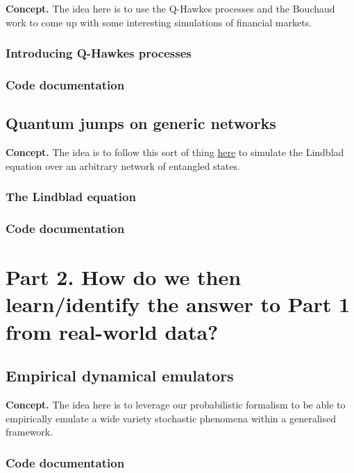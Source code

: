 \documentclass{book}
\begin{document}
{\bfseries\sffamily Concept.} The idea here is to use the Q-Hawkes processes and the Bouchaud work to come up with some interesting simulations of financial markets. 

\section{\sffamily Introducing Q-Hawkes processes}


\section{\sffamily Code documentation}



\chapter{\sffamily Quantum jumps on generic networks}

{\bfseries\sffamily Concept.} The idea is to follow this sort of thing \href{https://en.wikipedia.org/wiki/Quantum_jump_method}{here} to simulate the Lindblad equation over an arbitrary network of entangled states.

\section{\sffamily The Lindblad equation}


\section{\sffamily Code documentation}


\part*{{\sffamily Part 2. {\color{gray75} How do we then learn/identify the answer to Part 1 from real-world data?}}}

\chapter{\sffamily Empirical dynamical emulators}

{\bfseries\sffamily Concept.} The idea here is to leverage our probabilistic formalism to be able to empirically emulate a wide variety stochastic phenomena within a generalised framework.

\section{\sffamily Code documentation}
\end{document}
